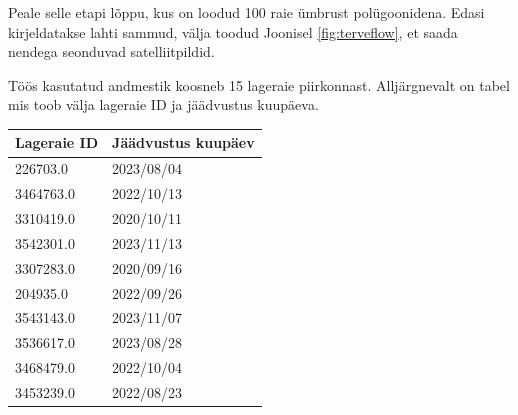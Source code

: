 Peale selle etapi lõppu, kus on loodud 100 raie ümbrust polügoonidena. Edasi kirjeldatakse lahti sammud, välja toodud Joonisel \ref{fig:terveflow}, et saada nendega seonduvad satelliitpildid.

Töös kasutatud andmestik koosneb 15 lageraie piirkonnast. Alljärgnevalt on tabel mis toob välja lageraie ID ja jäädvustus kuupäeva.
\bigskip


\begin{longtable}{ll}
    \hline
    \textbf{Lageraie ID} & \textbf{Jäädvustus kuupäev} \\
    \hline
        226703.0 & 2023/08/04 \\
        3464763.0 & 2022/10/13 \\
        3310419.0 & 2020/10/11 \\
        3542301.0 & 2023/11/13 \\
        3307283.0 & 2020/09/16 \\
        204935.0 & 2022/09/26 \\
        3543143.0 & 2023/11/07 \\
        3536617.0 & 2023/08/28 \\
        3468479.0 & 2022/10/04 \\
        3453239.0 & 2022/08/23 \\
        \hline
\end{longtable}


